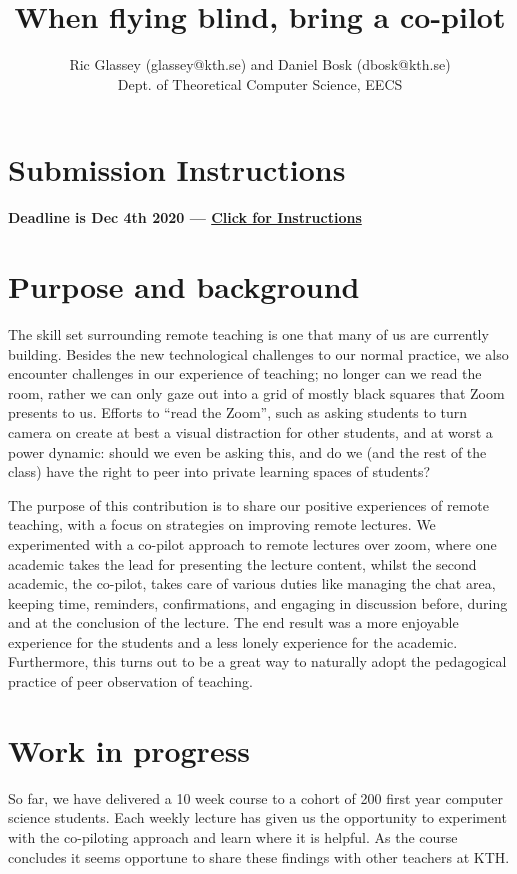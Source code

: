 \documentclass{article}
\title{When flying blind, bring a co-pilot}
\author{Ric Glassey (glassey@kth.se) and Daniel Bosk (dbosk@kth.se)\\
Dept. of Theoretical Computer Science, EECS
}
\date{}
\begin{document}
\maketitle

\section*{Submission Instructions}
\textbf{Deadline is Dec 4th 2020 --- \href{https://intra.kth.se/utbildning/utveckling-och-hogskolepedagogik/kth-sotl/conference-kth/instruktioner-for-bidrag-1.970431}{Click for Instructions}}

\section*{Purpose and background}
The skill set surrounding remote teaching is one that many of us are currently building. Besides the new technological challenges to our normal practice, we also encounter challenges in our experience of teaching; no longer can we read the room, rather we can only gaze out into a grid of mostly black squares that Zoom presents to us. Efforts to ``read the Zoom'', such as asking students to turn camera on create at best a visual distraction for other students, and at worst a power dynamic: should we even be asking this, and do we (and the rest of the class) have the right to peer into private learning spaces of students?

The purpose of this contribution is to share our positive experiences of remote teaching, with a focus on strategies on improving remote lectures. We experimented with a co-pilot approach to remote lectures over zoom, where one academic takes the lead for presenting the lecture content, whilst the second academic, the co-pilot, takes care of various duties like managing the chat area, keeping time, reminders, confirmations, and engaging in discussion before, during and at the conclusion of the lecture. The end result was a more enjoyable experience for the students and a less lonely experience for the academic. Furthermore, this turns out to be a great way to naturally adopt the pedagogical practice of peer observation of teaching.

\section*{Work in progress}
So far, we have delivered a 10 week course to a cohort of 200 first year computer science students. Each weekly lecture has given us the opportunity to experiment with the co-piloting approach and learn where it is helpful. As the course concludes it seems opportune to share these findings with other teachers at KTH.
\end{document}
